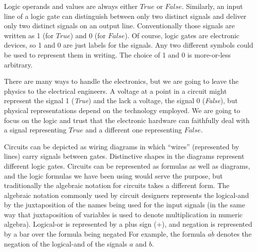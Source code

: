 Logic operands and values are always either $True$ or $False$.
Similarly, an input line of a logic gate can distinguish between
only two distinct signals
and deliver only two distinct signals on an output line.
Conventionally those signals are written as 1 (for $True$) and 0 (for $False$).
Of course, logic gates are electronic devices,
so 1 and 0 are just labels for the signals.
Any two different symbols could be used to represent them in writing.
The choice of 1 and 0 is more-or-less arbitrary.

There are many ways to handle the electronics,
but we are going to leave the physics to the electrical engineers.
A voltage at a point in a circuit might represent
the signal 1 (\emph{True})
and the lack a voltage, the signal 0 (\emph{False}),
but physical representations depend on the technology employed.
We are going to focus on the logic and trust that
the electronic hardware can faithfully deal with
a signal representing $True$ and a different one representing $False$.

Circuits
can be depicted as wiring diagrams
in which ``wires'' (represented by lines) carry signals between gates.
Distinctive shapes in the diagrams represent different logic gates.
Circuits can be represented as formulas as well as diagrams, and
the logic formulas we have been using would serve the purpose,
but traditionally the algebraic notation for circuits takes a
different form.
The algebraic notation commonly used by circuit
designers represents the logical-and by the juxtaposition
of the names being used for the input signals (in the same way
that juxtaposition of variables is used to denote multiplication
in numeric algebra). Logical-or is represented by a plus sign (+),
and negation is represented by a bar over the formula being negated
For example, the formula $\overline{ab}$ denotes the negation of the logical-and
of the signals $a$ and $b$.

